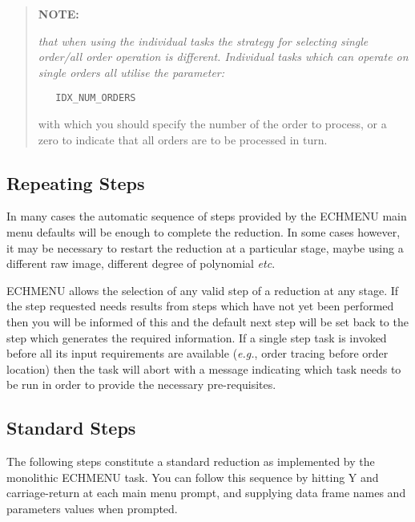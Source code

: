 \begin{quote}

   {\bf NOTE:} {\sl that when using the individual tasks the strategy for
   selecting single order/all order operation is different.  Individual
   tasks which can operate on single orders all utilise the parameter:

\begin{verbatim}
   IDX_NUM_ORDERS
\end{verbatim}

   with which you should specify the number of the order to process, or a
   zero to indicate that all orders are to be processed in turn.}
\end{quote}


\subsection{Repeating Steps}

In many cases the automatic sequence of steps provided by the ECHMENU
main menu defaults will be enough to complete the reduction. In some
cases however, it may be necessary to restart the reduction at a
particular stage, maybe using a different raw image, different degree
of polynomial {\it etc}.

ECHMENU allows the selection of any valid step of a reduction at any stage.
If the step requested needs results from steps which have not yet been
performed then you will be informed of this and the default next step
will be set back to the step which generates the required information.
If a single step task is invoked before all its input requirements are
available ({\it{e.g.}}, order tracing before order location) then the task
will abort with a message indicating which task needs to be run in order to
provide the necessary pre-requisites.


\subsection{Standard Steps}

The following steps constitute a standard reduction as implemented by
the monolithic ECHMENU task.  You can follow this sequence by hitting
Y and carriage-return at each main menu prompt, and supplying data frame names
and parameters values when prompted.

